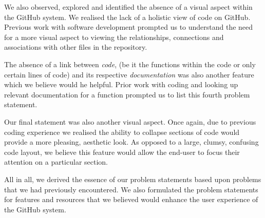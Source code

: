 \documentclass[12pt]{article}
\begin{document}
We also observed, explored and identified the absence of a visual aspect within the \textsf{GitHub} system. We realised the lack of a holistic view of code on \textsf{GitHub}. Previous work with software development prompted us to understand the need for a more visual aspect to viewing the relationships, connections and associations with other files in the repository.

The absence of a link between \textit{code}, (be it the functions within the code or only certain lines of code) and its respective \textit{documentation} was also another feature which we believe would he helpful. Prior work with coding and looking up relevant documentation for a function prompted us to list this fourth problem statement.

Our final statement was also another visual aspect. Once again, due to previous coding experience we realised the ability to collapse sections of code would provide a more pleasing, aesthetic look. As opposed to a large, clumsy, confusing code layout, we believe this feature would allow the end-user to focus their attention on a particular section.

All in all, we derived the essence of our problem statements based upon problems that we had previously encountered. We also formulated the problem statements for features and resources that we believed would enhance the user experience of the \textsf{GitHub} system.
\end{document}
